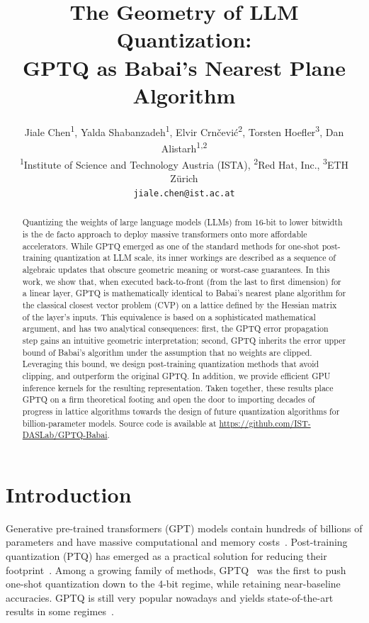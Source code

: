 \documentclass{article} %
\title{The Geometry of LLM Quantization: \\ GPTQ as Babai's Nearest Plane Algorithm}
\author{Jiale Chen\textsuperscript{\textmd{1}},
Yalda Shabanzadeh\textsuperscript{\textmd{1}},
Elvir Crnčević\textsuperscript{\textmd{2}},
Torsten Hoefler\textsuperscript{\textmd{3}},
Dan Alistarh\textsuperscript{\textmd{1,2}} \\
\textsuperscript{1}Institute of Science and Technology Austria (ISTA),
\textsuperscript{2}Red Hat, Inc.,
\textsuperscript{3}ETH Zürich \\
\texttt{jiale.chen@ist.ac.at} \\
}
\begin{document}
\doparttoc %
\faketableofcontents %

\maketitle

\begin{abstract}
Quantizing the weights of large language models (LLMs) from 16-bit to lower bitwidth is the de facto approach to deploy massive transformers onto more affordable accelerators.
While GPTQ emerged as one of the standard methods for one-shot post-training quantization at LLM scale, its inner workings are described as a sequence of algebraic updates that obscure geometric meaning or worst-case guarantees.
In this work, we show that, when executed back-to-front (from the last to first dimension) for a linear layer, GPTQ is mathematically identical to Babai's nearest plane algorithm for the classical closest vector problem (CVP) on a lattice defined by the Hessian matrix of the layer's inputs.
This equivalence is based on a sophisticated mathematical argument, and has two analytical consequences:
first, the GPTQ error propagation step gains an intuitive geometric interpretation;
second, GPTQ inherits the error upper bound of Babai's algorithm under the assumption that no weights are clipped.
Leveraging this bound, we design post-training quantization methods that avoid clipping, and outperform the original GPTQ.
In addition, we provide efficient GPU inference kernels for the resulting representation.
Taken together, these results place GPTQ on a firm theoretical footing and open the door to importing decades of progress in lattice algorithms towards the design of future quantization algorithms for billion-parameter models.
Source code is available at \url{https://github.com/IST-DASLab/GPTQ-Babai}.
\end{abstract}

\section{Introduction}
\label{sec:intro}

Generative pre-trained transformers (GPT) models contain hundreds of billions of parameters and have massive computational and memory costs~\citep{10.1145/3630106.3658542}.
Post-training quantization (PTQ) has emerged as a practical solution for reducing their footprint~\citep{gholami2021surveyquantizationmethodsefficient}.
Among a growing family of methods, GPTQ~\citep{frantar2023optq} was the first to push one-shot quantization down to the 4-bit regime, while retaining near-baseline accuracies. GPTQ is still very popular nowadays and yields state-of-the-art results in some regimes~\citep{kurtic-etal-2025-give}.
\end{document}
